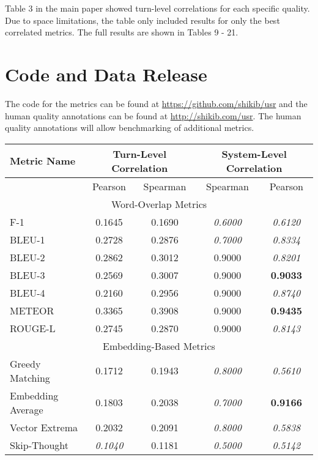 \documentclass[11pt,a4paper]{article}
\begin{document}
Table 3 in the main paper showed turn-level correlations for each specific quality. Due to space limitations, the table only included results for only the best correlated metrics. The full results are shown in Tables 9 - 21.

\section{Code and Data Release}

The code for the metrics can be found at \url{https://github.com/shikib/usr} and the human quality annotations can be found at \url{http://shikib.com/usr}. The human quality annotations will allow benchmarking of additional metrics. 

\begin{table*}
    \centering
    \renewcommand*{\arraystretch}{1.2}
    \begin{tabular}{|l|c|c|c|c|}
    \hline
        \textbf{Metric Name} & \multicolumn{2}{|c|}{\textbf{Turn-Level Correlation}} & \multicolumn{2}{|c|}{\textbf{System-Level Correlation}}  \\ \hline
         & Pearson & Spearman & Spearman & Pearson \\ \hline
         \multicolumn{5}{|c|}{Word-Overlap Metrics} \\ \hline
         F-1 & 0.1645 & 0.1690 & \textit{0.6000} & \textit{0.6120} \\
BLEU-1 & 0.2728 & 0.2876 & \textit{0.7000} & \textit{0.8334} \\
BLEU-2 & 0.2862 & 0.3012 & 0.9000 & \textit{0.8201} \\
BLEU-3 & 0.2569 & 0.3007 & 0.9000 & \textbf{0.9033} \\
BLEU-4 & 0.2160 & 0.2956 & 0.9000 & \textit{0.8740} \\
METEOR & 0.3365 & 0.3908 & 0.9000 & \textbf{0.9435} \\
ROUGE-L & 0.2745 & 0.2870 & 0.9000 & \textit{0.8143} \\ \hline
\multicolumn{5}{|c|}{Embedding-Based Metrics} \\ \hline
Greedy Matching & 0.1712 & 0.1943 & \textit{0.8000} & \textit{0.5610} \\
Embedding Average & 0.1803 & 0.2038 & \textit{0.7000} & \textbf{0.9166} \\
Vector Extrema & 0.2032 & 0.2091 & \textit{0.8000} & \textit{0.5838} \\
Skip-Thought & \textit{0.1040} & 0.1181 & \textit{0.5000} & \textit{0.5142} \\

\end{tabular}
\end{table*}
\end{document}
